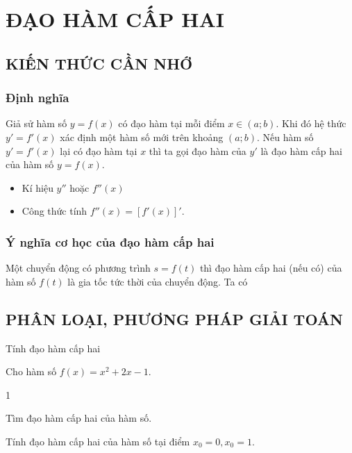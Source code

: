 \section{ĐẠO HÀM CẤP HAI}
\subsection{KIẾN THỨC CẦN NHỚ}
\subsubsection{Định nghĩa}
	Giả sử hàm số $y = f(x)$ có đạo hàm tại mỗi điểm $x \in (a; b)$. Khi đó hệ thức $y'= f'(x)$ xác định một hàm số mới trên khoảng $(a; b)$. Nếu hàm số $y' = f'(x)$ lại có đạo hàm tại $x$ thì ta gọi đạo hàm của $y'$ là đạo hàm cấp hai của hàm số $y = f(x)$.
	\begin{gachsoc}
	\begin{itemize}
		\item [$\bullet$] Kí hiệu $y''$ hoặc $f''(x)$
		\item [$\bullet$] Công thức tính $f''(x)=[f'(x)]'$.
	\end{itemize}
\end{gachsoc}
\subsubsection{Ý nghĩa cơ học của đạo hàm cấp hai}
	Một chuyển động có phương trình $s=f(t)$ thì đạo hàm cấp hai (nếu có) của hàm số $f(t)$ là gia tốc tức thời của chuyển động. Ta có 
\subsection{PHÂN LOẠI, PHƯƠNG PHÁP GIẢI TOÁN}

\begin{dang}{Tính đạo hàm cấp hai}
\end{dang}

\begin{vd}%
	Cho hàm số $f(x)=x^2+2 x-1$.
	\begin{enumEX}{1}
		\item Tìm đạo hàm cấp hai của hàm số.
		\item Tính đạo hàm cấp hai của hàm số tại điểm $x_0=0, x_0=1$.
	\end{enumEX}
\end{vd} 


